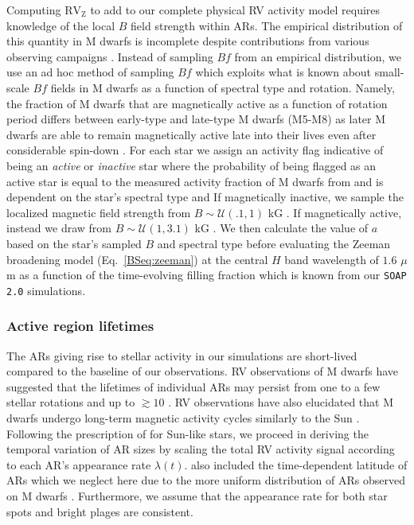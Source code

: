 Computing $\text{RV}_{\text{Z}}$ to add to our complete physical RV activity model requires knowledge of the
local $B$ field strength within
ARs. The empirical distribution of this quantity in M dwarfs is incomplete despite contributions from
various observing campaigns \citep[e.g.][]{reiners07, shulyak14, hebrard16, moutou17, shulyak17}. 
Instead of sampling $Bf$ from an empirical distribution, we use an ad hoc method of sampling $Bf$ which
exploits what is known about small-scale $Bf$
fields in M dwarfs as a function of spectral type and rotation. Namely, the fraction of M dwarfs
that are magnetically active as a function of rotation period differs between early-type
and late-type M dwarfs (M5-M8) as later M dwarfs are able to remain magnetically
active late into their lives even after considerable spin-down \citep{west15}. For each star we assign an
activity flag indicative of being an \emph{active} or \emph{inactive} star where the probability of being
flagged as an active star is equal to the measured activity fraction of M dwarfs from \cite{west15} and 
is dependent on the star's spectral type and  If magnetically inactive, we sample the localized
magnetic field strength from $B \sim \mathcal{U}(.1,1)$ kG \citep{moutou17}. If magnetically active, instead
we draw from $B \sim \mathcal{U}(1,3.1)$ kG \citep{moutou17}. We then calculate the value of $a$ based on the
star's sampled $B$ and spectral type before evaluating the Zeeman broadening model (Eq.~\ref{BSeq:zeeman}) at the
central $H$ band wavelength of $1.6$ $\mu$m as a function of the time-evolving filling fraction which is known
from our \texttt{SOAP 2.0} simulations.


\subsubsection{Active region lifetimes} \label{BSsect:lifetimes}
The ARs giving rise to stellar activity in our simulations are short-lived compared to the baseline
of our observations. RV observations of M dwarfs have suggested that the lifetimes of individual ARs
may persist from one to a few stellar rotations and up to $\gtrsim 10$
\citep[e.g.][]{bonfils07,forveille09,hebrard16}. RV observations have also elucidated that M dwarfs undergo
long-term magnetic
activity cycles similarly to the Sun \citep[e.g.][]{gomesdasilva12, route16}. Following the prescription
of \cite{dumusque16a} for Sun-like stars, we proceed in deriving the temporal variation of AR sizes by scaling the
total RV activity signal according to each AR's appearance rate $\lambda(t)$. \cite{dumusque16a} also included
the time-dependent latitude of ARs which we neglect here due to the more uniform distribution of ARs observed
on M dwarfs \citep{barnes01, barnes04}. Furthermore, we assume that the appearance rate for both star spots and
bright plages are consistent.

